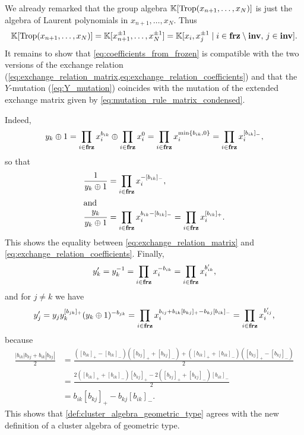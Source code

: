We already remarked that the group algebra $\mathbb{K}[\operatorname{Trop}(x_{n+1}, \dots, x_{N})]$ is just
the algebra of Laurent polynomials in $x_{n+1}, \dots, x_N$. Thus
\begin{equation*}
	\mathbb{K}[\operatorname{Trop}(x_{n+1}, \dots, x_N)] = \mathbb{K}[x_{n+1}^{\pm 1}, \dots, x_N^{\pm 1}] = \mathbb{K}[x_i, x_j^{\pm 1} \mid i \in \mathbf{frz} \setminus \mathbf{inv},\,j \in \mathbf{inv}].
\end{equation*}
%
It remains to show that \cref{eq:coefficients_from_frozen} is compatible with the two
versions of the exchange relation
(\cref{eq:exchange_relation_matrix,eq:exchange_relation_coefficients}) and that the
$Y$-mutation (\cref{eq:Y_mutation}) coincides with the mutation of the extended
exchange matrix given by \cref{eq:mutation_rule_matrix_condensed}.

Indeed,
\begin{equation*}
	y_k \oplus 1 = \prod_{i \in \mathbf{frz}} x_i^{b_{ik}} \oplus \prod_{i \in \mathbf{frz}} x_i^0 = \prod_{i \in \mathbf{frz}}x_i^{\min\{b_{ik}, 0\}} = \prod_{i \in \mathbf{frz}} x_i^{[b_{ik}]_{-}},
\end{equation*}
so that
\begin{align*}
	\frac{1}{y_k \oplus 1}   & = \prod_{i \in \mathbf{frz}} x_i^{-[b_{ik}]_{-}},                                                 \\
	\shortintertext{and}
	\frac{y_k}{y_k \oplus 1} & = \prod_{i \in \mathbf{frz}} x_i^{b_{ik} - [b_{ik}]_{-}} = \prod_{i \in \mathbf{frz}} x_i^{[b_{ik}]_{+}}.
\end{align*}
%
This shows the equality between \cref{eq:exchange_relation_matrix} and
\cref{eq:exchange_relation_coefficients}. Finally,
\begin{equation*}
	y_k' = y_k^{-1} = \prod_{i \in \mathbf{frz}}x_i^{-b_{ik}} = \prod_{i \in \mathbf{frz}}x_i^{b'_{ik}},
\end{equation*}
and for $j\neq k$ we have
\begin{equation*}
	y'_j = y_j y_k^{[b_{jk}]_{+}}(y_k \oplus 1)^{-b_{jk}} = \prod_{i \in \mathbf{frz}}x_i^{b_{ij} + b_{ik}[b_{kj}]_{+} - b_{kj}[b_{ik}]_{-}} = \prod_{i \in \mathbf{frz}}x_i^{b'_{ij}},
\end{equation*}
%
because
\begin{align*}
	\frac{|b_{ik}|b_{kj} + b_{ik}|b_{kj}|}{2}
	 & =\frac{([b_{ik}]_{+} - [b_{ik}]_{-})([b_{kj}]_{+} + [b_{kj}]_{-}) + ([b_{ik}]_{+} + [b_{ik}]_{-})([b_{kj}]_{+} - [b_{kj}]_{-})}{2} \\
	 & =\frac{2([b_{ik}]_{+} + [b_{ik}]_{-})[b_{kj}]_{+} - 2([b_{kj}]_{+} + [b_{kj}]_{-})[b_{ik}]_{-}}{2}                                 \\
	 & =  b_{ik}[b_{kj}]_{+} - b_{kj}[b_{ik}]_{-}.
\end{align*}
%
This shows that \cref{def:cluster_algebra_geometric_type} agrees with the new
definition of a cluster algebra of geometric type.

